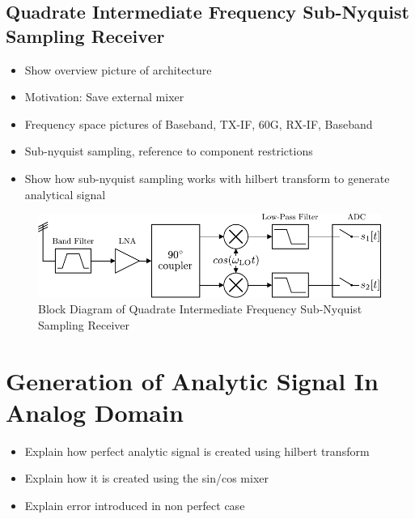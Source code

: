 \subsection{Quadrate Intermediate Frequency Sub-Nyquist Sampling Receiver}
\begin{itemize}
\item Show overview picture of architecture
\item Motivation: Save external mixer
\item Frequency space pictures of Baseband, TX-IF, 60G, RX-IF, Baseband
\item Sub-nyquist sampling, reference to component restrictions
\item Show how sub-nyquist sampling works with hilbert transform to generate analytical signal
\end{itemize}

\begin{figure}[ht]
  \centering
  \includegraphics[width=\textwidth]{figures/quad_if_rx_block_diagram}
  \caption{Block Diagram of Quadrate Intermediate Frequency Sub-Nyquist Sampling Receiver}
  \label{fig:rx_quad_if_bd}
\end{figure}

\section{Generation of Analytic Signal In Analog Domain}
\begin{itemize}
\item Explain how perfect analytic signal is created using hilbert transform
\item Explain how it is created using the sin/cos mixer
\item Explain error introduced in non perfect case
\end{itemize}
